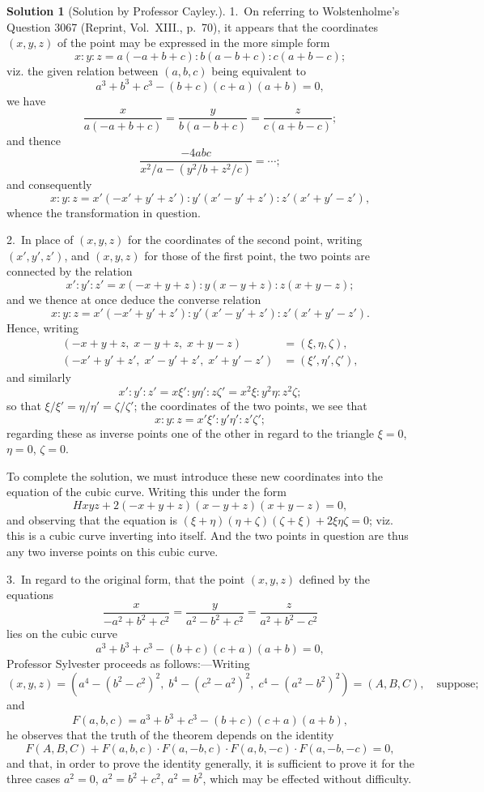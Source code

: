 \documentclass[11pt,a4paper]{article}
\theoremstyle{definition}
\newtheorem*{solution}{Solution}
\begin{document}
\begin{solution}[Solution by Professor Cayley.]
1.~On referring to Wolstenholme's Question 3067 (Reprint, Vol.~XIII., p.~70), it appears that the coordinates $(x,y,z)$ of the point may be expressed in the more simple form
\[
x : y : z = a(-a+b+c) : b(a-b+c) : c(a+b-c);
\]
viz. the given relation between $(a,b,c)$ being equivalent to
\[
a^3 + b^3 + c^3 - (b+c)(c+a)(a+b) = 0,
\]
we have
\[
\frac{x}{a(-a+b+c)} = \frac{y}{b(a-b+c)} = \frac{z}{c(a+b-c)};
\]
and thence
\[
\frac{-4abc}{x^2/a - (y^2/b + z^2/c)} = \cdots;
\]
and consequently
\[
x : y : z = x'(-x'+y'+z') : y'(x'-y'+z') : z'(x'+y'-z'),
\]
whence the transformation in question.

2.~In place of $(x,y,z)$ for the coordinates of the second point, writing $(x',y',z')$, and $(x,y,z)$ for those of the first point, the two points are connected by the relation
\[
x' : y' : z' = x(-x+y+z) : y(x-y+z) : z(x+y-z);
\]
and we thence at once deduce the converse relation
\[
x : y : z = x'(-x'+y'+z') : y'(x'-y'+z') : z'(x'+y'-z').
\]
Hence, writing
\[
\begin{aligned}
(-x+y+z, \; x-y+z, \; x+y-z) &= (\xi, \eta, \zeta), \\
(-x'+y'+z', \; x'-y'+z', \; x'+y'-z') &= (\xi', \eta', \zeta'),
\end{aligned}
\]
and similarly
\[
x' : y' : z' = x\xi' : y\eta' : z\zeta' = x^2\xi : y^2\eta : z^2\zeta;
\]
so that $\xi/\xi' = \eta/\eta' = \zeta/\zeta'$; the coordinates of the two points, we see that
\[
x : y : z = x'\xi' : y'\eta' : z'\zeta';
\]
regarding these as inverse points one of the other in regard to the triangle $\xi=0$, $\eta=0$, $\zeta=0$.

To complete the solution, we must introduce these new coordinates into the equation of the cubic curve. Writing this under the form
\[
Hxyz + 2(-x+y+z)(x-y+z)(x+y-z) = 0,
\]
and observing that the equation is $(\xi+\eta)(\eta+\zeta)(\zeta+\xi) + 2\xi\eta\zeta = 0$; viz. this is a cubic curve inverting into itself. And the two points in question are thus any two inverse points on this cubic curve.

3.~In regard to the original form, that the point $(x,y,z)$ defined by the equations
\[
\frac{x}{-a^2+b^2+c^2} = \frac{y}{a^2-b^2+c^2} = \frac{z}{a^2+b^2-c^2}
\]
lies on the cubic curve
\[
a^3+b^3+c^3-(b+c)(c+a)(a+b)=0,
\]
Professor Sylvester proceeds as follows:---Writing
\[
(x,y,z) = (a^4-(b^2-c^2)^2, \; b^4-(c^2-a^2)^2, \; c^4-(a^2-b^2)^2) = (A,B,C), \quad\text{suppose;}
\]
and
\[
F(a,b,c) = a^3+b^3+c^3-(b+c)(c+a)(a+b),
\]
he observes that the truth of the theorem depends on the identity
\[
F(A,B,C) + F(a,b,c) \cdot F(a,-b,c) \cdot F(a,b,-c) \cdot F(a,-b,-c) = 0,
\]
and that, in order to prove the identity generally, it is sufficient to prove it for the three cases $a^2=0$, $a^2=b^2+c^2$, $a^2=b^2$, which may be effected without difficulty.


\end{solution}
\end{document}
